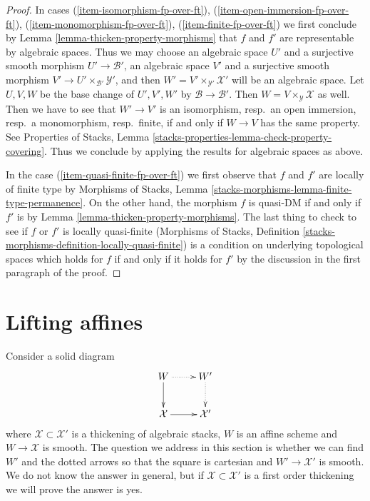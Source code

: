 \documentclass{stacks-project}
\theoremstyle{plain}
\theoremstyle{definition}
\theoremstyle{remark}
\numberwithin{equation}{subsection}
\begin{document}
\begin{proof}
\medskip\noindent
In cases (\ref{item-isomorphism-fp-over-ft}),
(\ref{item-open-immersion-fp-over-ft}),
(\ref{item-monomorphism-fp-over-ft}),
(\ref{item-finite-fp-over-ft})
we first conclude by Lemma \ref{lemma-thicken-property-morphisms}
that $f$ and $f'$ are representable by algebraic spaces. Thus we may choose
an algebraic space $U'$ and a surjective smooth morphism
$U' \to \mathcal{B}'$,
an algebraic space $V'$ and a surjective smooth morphism
$V' \to U' \times_{\mathcal{B}'} \mathcal{Y}'$, and then
$W' = V' \times_{\mathcal{Y}'} \mathcal{X}'$ will be an algebraic space.
Let $U, V, W$ be the base change of
$U', V', W'$ by $\mathcal{B} \to \mathcal{B}'$.
Then $W = V \times_\mathcal{Y} \mathcal{X}$ as well.
Then we have to see that $W' \to V'$ is an
isomorphism, resp.\ an open immersion, resp.\ a monomorphism,
resp.\ finite, if and only if $W \to V$ has the same property.
See Properties of Stacks, Lemma
\ref{stacks-properties-lemma-check-property-covering}.
Thus we conclude by applying the results
for algebraic spaces as above.

\medskip\noindent
In the case (\ref{item-quasi-finite-fp-over-ft}) we first
observe that $f$ and $f'$ are locally of finite type by
Morphisms of Stacks, Lemma \ref{stacks-morphisms-lemma-finite-type-permanence}.
On the other hand, the morphism $f$ is quasi-DM if and only if
$f'$ is by
Lemma \ref{lemma-thicken-property-morphisms}.
The last thing to check to see if $f$ or $f'$ is locally quasi-finite
(Morphisms of Stacks, Definition
\ref{stacks-morphisms-definition-locally-quasi-finite})
is a condition on underlying topological spaces
which holds for $f$ if and only if it holds for $f'$ by
the discussion in the first paragraph of the proof.
\end{proof}









\section{Lifting affines}
\label{section-lifting-affines}

\noindent
Consider a solid diagram
$$
\xymatrix{
W \ar[d] \ar@{..>}[r] & W' \ar@{..>}[d] \\
\mathcal{X} \ar[r] & \mathcal{X}'
}
$$
where $\mathcal{X} \subset \mathcal{X}'$ is a thickening of algebraic stacks,
$W$ is an affine scheme and $W \to \mathcal{X}$ is smooth. The question
we address in this section is whether we can find $W'$ and the dotted
arrows so that the square is cartesian and $W' \to \mathcal{X}'$ is smooth.
We do not know the answer in general, but if $\mathcal{X} \subset \mathcal{X}'$
is a first order thickening we will prove the answer is yes.
\end{document}
